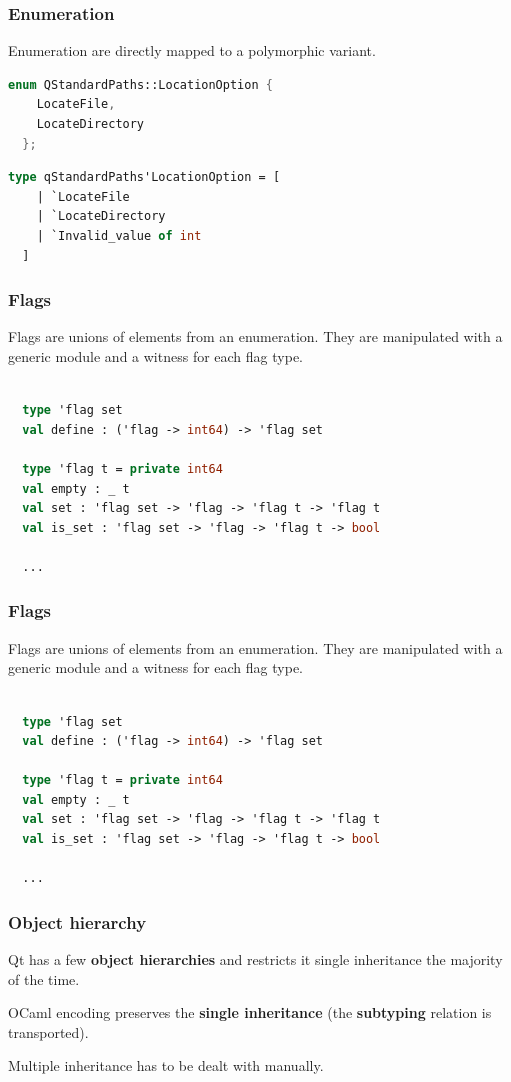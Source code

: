 \documentclass[serif,mathserif]{beamer}
\begin{document}
\begin{frame}[fragile]
  \frametitle{Enumeration}

  Enumeration are directly mapped to a polymorphic variant.
  \begin{lstlisting}[language=C++]
  enum QStandardPaths::LocationOption {
    LocateFile,
    LocateDirectory
  };
  \end{lstlisting}

  \begin{lstlisting}[language=Caml]
  type qStandardPaths'LocationOption = [
    | `LocateFile
    | `LocateDirectory
    | `Invalid_value of int
  ]
  \end{lstlisting}
\end{frame}

\begin{frame}[fragile]
  \frametitle{Flags}

  Flags are unions of elements from an enumeration.  They are manipulated with
  a generic module and a witness for each flag type.

  \begin{lstlisting}[language=Caml,morekeywords={val}]

  type 'flag set
  val define : ('flag -> int64) -> 'flag set
  
  type 'flag t = private int64
  val empty : _ t
  val set : 'flag set -> 'flag -> 'flag t -> 'flag t
  val is_set : 'flag set -> 'flag -> 'flag t -> bool

  ...
  \end{lstlisting}
\end{frame}

\begin{frame}[fragile]
  \frametitle{Flags}

  Flags are unions of elements from an enumeration.  They are manipulated with
  a generic module and a witness for each flag type.

  \begin{lstlisting}[language=Caml,morekeywords={val}]

  type 'flag set
  val define : ('flag -> int64) -> 'flag set
  
  type 'flag t = private int64
  val empty : _ t
  val set : 'flag set -> 'flag -> 'flag t -> 'flag t
  val is_set : 'flag set -> 'flag -> 'flag t -> bool

  ...
  \end{lstlisting}
\end{frame}

\begin{frame}
  \frametitle{Object hierarchy}

  Qt has a few {\bf object hierarchies} and restricts it single inheritance the
  majority of the time.

  OCaml encoding preserves the {\bf single inheritance} (the {\bf subtyping}
  relation is transported). 
  
  Multiple inheritance has to be dealt with manually.
\end{frame}
\end{document}
